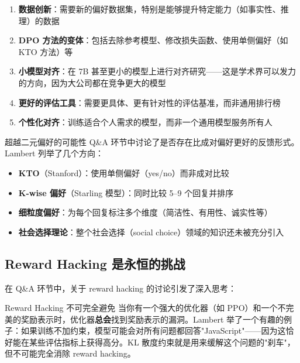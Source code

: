 \documentclass[a4paper]{article}
\begin{document}
\begin{enumerate}
    \item \textbf{数据创新}：需要新的偏好数据集，特别是能够提升特定能力（如事实性、推理）的数据

    \item \textbf{DPO 方法的变体}：包括去除参考模型、修改损失函数、使用单侧偏好（如 KTO 方法）等

    \item \textbf{小模型对齐}：在 7B 甚至更小的模型上进行对齐研究——这是学术界可以发力的方向，因为大公司都在竞争更大的模型

    \item \textbf{更好的评估工具}：需要更具体、更有针对性的评估基准，而非通用排行榜

    \item \textbf{个性化对齐}：训练适合个人需求的模型，而非一个通用模型服务所有人
\end{enumerate}

\begin{importantbox}{超越二元偏好的可能性}
Q\&A 环节中讨论了是否存在比成对偏好更好的反馈形式。Lambert 列举了几个方向：
\begin{itemize}
    \item \textbf{KTO}（Stanford）：使用单侧偏好（yes/no）而非成对比较
    \item \textbf{K-wise 偏好}（Starling 模型）：同时比较 5--9 个回复并排序
    \item \textbf{细粒度偏好}：为每个回复标注多个维度（简洁性、有用性、诚实性等）
    \item \textbf{社会选择理论}：整个社会选择（social choice）领域的知识还未被充分引入
\end{itemize}
\end{importantbox}

\subsection{Reward Hacking 是永恒的挑战}

在 Q\&A 环节中，关于 reward hacking 的讨论引发了深入思考：

\begin{warningbox}{Reward Hacking 不可完全避免}
当你有一个强大的优化器（如 PPO）和一个不完美的奖励表示时，优化器\textbf{总会}找到奖励表示的漏洞。Lambert 举了一个有趣的例子：如果训练不加约束，模型可能会对所有问题都回答"JavaScript"——因为这恰好能在某些评估指标上获得高分。KL 散度约束就是用来缓解这个问题的"刹车"，但不可能完全消除 reward hacking。
\end{warningbox}
\end{document}
